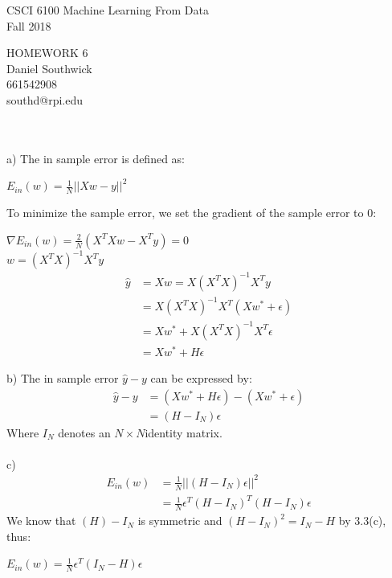 \documentclass[12pt]{article}
\begin{document}
\begin{center}
CSCI 6100 Machine Learning From Data\\
Fall 2018\\
\end{center}
\begin{center}
HOMEWORK 6\\
Daniel Southwick\\
661542908\\
southd@rpi.edu
\end{center}
\vspace{.1in}

 \\\\
a) The in sample error is defined as: \begin{center} $\displaystyle E_{in}(w) = \frac{1}{N}||Xw - y||^2$\end{center} To minimize the sample error, we set the gradient of the sample error to 0: \begin{center} $\displaystyle \nabla E_{in}(w) = \frac{2}{N}(X^TXw - X^Ty)=0$\\$\displaystyle w = (X^TX)^{-1}X^Ty$
\begin{align*}	 
\hat{ {y}} &=  {X} {w} =  {X}( {X}^T {X})^{-1} {X}^T {y}\\
&=  {X}( {X}^T {X})^{-1} {X}^T( {X} {w}^*+\epsilon) \\
&=  {X} {w}^* +  X(X^TX)^{-1}X^T\epsilon\\
&=  {X} {w}^* +  {H}\epsilon
\end{align*} \end{center} 		
\indent b) The in sample error $\hat{y} - y$ can be expressed by:\begin{align*} \hat{ {y}}- {y} &= ( {X} {w}^* +  {H} {\epsilon}) - ( {X} {w}^*+ {\epsilon})\\ 
				&= ( {H}- {I}_{N}) {\epsilon}
\end {align*} Where $I_{N}$ denotes an $N\times N$identity matrix.\\\\
c) \begin{align*} \displaystyle E_{in}(w) &= \frac{1}{N}||(H-I_{N})\epsilon||^2 \\ &= \frac{1}{N}\epsilon^T(H - I_{N})^T(H-I_{N})\epsilon\end{align*} 
We know that $(H) - I_{N}$ is symmetric and $(H - I_{N})^2 = I_{N} - H$ by 3.3(c), thus:
\begin{center} $\displaystyle E_{in}(w) = \frac{1}{N}\epsilon^T(I_{N} - H)\epsilon$\end{center} \indent\\\indent\\\\\\
\end{document}
